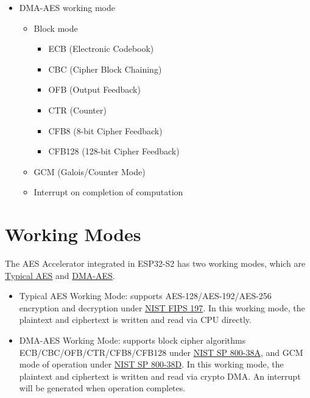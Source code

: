 \documentclass[main\_\_EN.tex]{subfiles}
\begin{document}
    \begin{itemize}
    \item DMA-AES working mode
        \begin{itemize}
            \item Block mode
                \begin{itemize}
                    \item ECB (Electronic Codebook)
                    \item CBC (Cipher Block Chaining)
                    \item OFB (Output Feedback)
                    \item CTR (Counter)
                    \item CFB8 (8-bit Cipher Feedback)
                    \item CFB128 (128-bit Cipher Feedback)
                \end{itemize}
            \item GCM (Galois/Counter Mode)
            \item Interrupt on completion of computation
        \end{itemize}
    \end{itemize}

\section{Working Modes}

The AES Accelerator integrated in ESP32-S2 has two working modes, which are \hyperref[subsection:typicalaes]{Typical AES} and \hyperref[subsection:dma-aes]{DMA-AES}.

\begin{itemize}
    \item Typical AES Working Mode: supports AES-128/AES-192/AES-256 encryption and decryption under \href{https://nvlpubs.nist.gov/nistpubs/FIPS/NIST.FIPS.197.pdf}{NIST FIPS 197}. In this working mode, the plaintext and ciphertext is written and read via CPU directly.
    \item DMA-AES Working Mode: supports block cipher algorithms ECB/CBC/OFB/CTR/CFB8/CFB128 under \href{https://nvlpubs.nist.gov/nistpubs/Legacy/SP/nistspecialpublication800-38a.pdf}{NIST SP 800-38A}, and GCM mode of operation under \href{https://nvlpubs.nist.gov/nistpubs/Legacy/SP/nistspecialpublication800-38d.pdf}{NIST SP 800-38D}. In this working mode, the plaintext and ciphertext is written and read via crypto DMA. An interrupt will be generated when operation completes.
\end{itemize}
\end{document}
